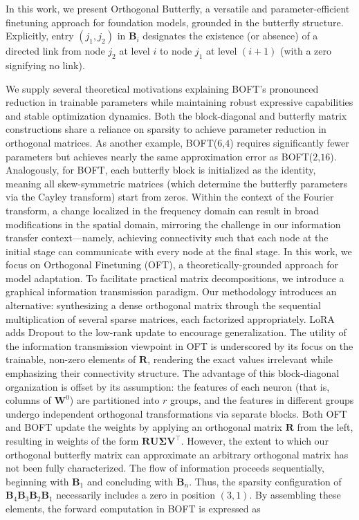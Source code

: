 In this work, we present Orthogonal Butterfly, a versatile and parameter-efficient finetuning approach for foundation models, grounded in the butterfly structure. Explicitly, entry $(j_1, j_2)$ in $\bm{B}_i$ designates the existence (or absence) of a directed link from node $j_2$ at level $i$ to node $j_1$ at level $(i+1)$ (with a zero signifying no link). \item We supply several theoretical motivations explaining BOFT's pronounced reduction in trainable parameters while maintaining robust expressive capabilities and stable optimization dynamics. Both the block-diagonal and butterfly matrix constructions share a reliance on sparsity to achieve parameter reduction in orthogonal matrices. As another example, BOFT($6$,$4$) requires significantly fewer parameters but achieves nearly the same approximation error as BOFT($2$,$16$). Analogously, for BOFT, each butterfly block is initialized as the identity, meaning all skew-symmetric matrices (which determine the butterfly parameters via the Cayley transform) start from zeros. Within the context of the Fourier transform, a change localized in the frequency domain can result in broad modifications in the spatial domain, mirroring the challenge in our information transfer context—namely, achieving connectivity such that each node at the initial stage can communicate with every node at the final stage. In this work, we focus on Orthogonal Finetuning (OFT), a theoretically-grounded approach for model adaptation. To facilitate practical matrix decompositions, we introduce a graphical information transmission paradigm. Our methodology introduces an alternative: synthesizing a dense orthogonal matrix through the sequential multiplication of several sparse matrices, each factorized appropriately. LoRA~\cite{hulora2022} adds Dropout to the low-rank update to encourage generalization. The utility of the information transmission viewpoint in OFT is underscored by its focus on the trainable, non-zero elements of $\bm{R}$, rendering the exact values irrelevant while emphasizing their connectivity structure. The advantage of this block-diagonal organization is offset by its assumption: the features of each neuron (that is, columns of $\bm{W}^0$) are partitioned into $r$ groups, and the features in different groups undergo independent orthogonal transformations via separate blocks. Both OFT and BOFT update the weights by applying an orthogonal matrix $\bm{R}$ from the left, resulting in weights of the form $\bm{R}\bm{U}\bm{\Sigma}\bm{V}^\top$. However, the extent to which our orthogonal butterfly matrix can approximate an arbitrary orthogonal matrix has not been fully characterized. The flow of information proceeds sequentially, beginning with $\bm{B}_1$ and concluding with $\bm{B}_n$. Thus, the sparsity configuration of $\bm{B}_4\bm{B}_3\bm{B}_2\bm{B}_1$ necessarily includes a zero in position $(3,1)$. By assembling these elements, the forward computation in BOFT is expressed as

